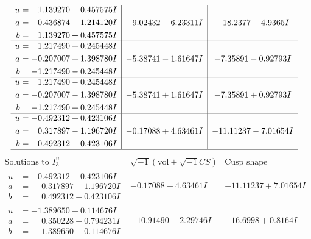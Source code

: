 \documentclass[1p]{elsarticle_modified}
\theoremstyle{definition}
\newcommand{\I}{\sqrt{-1}}
\begin{document}
$$\begin{array}{c|c|c}
\begin{aligned}
u &= -1.139270 - 0.457575 I \\
a &= -0.436874 - 1.214120 I \\
b &= \phantom{-}1.139270 + 0.457575 I\end{aligned}
 & -9.02432 - 6.23311 I & -18.2377 + 4.9365 I \\ \hline\begin{aligned}
u &= \phantom{-}1.217490 + 0.245448 I \\
a &= -0.207007 + 1.398780 I \\
b &= -1.217490 - 0.245448 I\end{aligned}
 & -5.38741 - 1.61647 I & -7.35891 - 0.92793 I \\ \hline\begin{aligned}
u &= \phantom{-}1.217490 - 0.245448 I \\
a &= -0.207007 - 1.398780 I \\
b &= -1.217490 + 0.245448 I\end{aligned}
 & -5.38741 + 1.61647 I & -7.35891 + 0.92793 I \\ \hline\begin{aligned}
u &= -0.492312 + 0.423106 I \\
a &= \phantom{-}0.317897 - 1.196720 I \\
b &= \phantom{-}0.492312 - 0.423106 I\end{aligned}
 & -0.17088 + 4.63461 I & -11.11237 - 7.01654 I\\
 \hline 
 \end{array}$$\newpage$$\begin{array}{c|c|c}  
\text{Solutions to }I^u_{3}& \I (\text{vol} + \sqrt{-1}CS) & \text{Cusp shape}\\
 \hline 
\begin{aligned}
u &= -0.492312 - 0.423106 I \\
a &= \phantom{-}0.317897 + 1.196720 I \\
b &= \phantom{-}0.492312 + 0.423106 I\end{aligned}
 & -0.17088 - 4.63461 I & -11.11237 + 7.01654 I \\ \hline\begin{aligned}
u &= -1.389650 + 0.114676 I \\
a &= \phantom{-}0.350228 + 0.794231 I \\
b &= \phantom{-}1.389650 - 0.114676 I\end{aligned}
 & -10.91490 - 2.29746 I & -16.6998 + 0.8164 I \\ \hline\begin{aligned}

\end{aligned}
\end{array}$$
\end{document}
